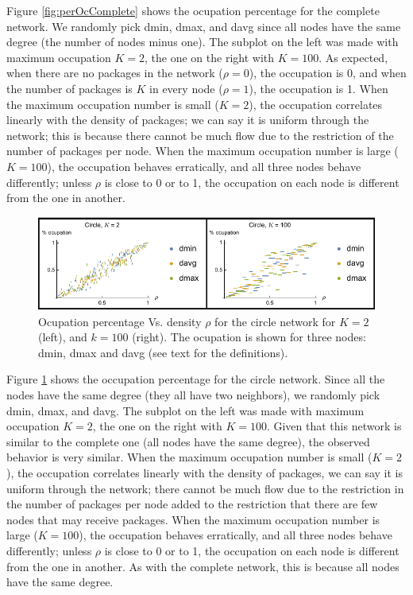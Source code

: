 \documentclass[12pt]{article}
\begin{document}
Figure \ref{fig:perOcComplete} shows the ocupation percentage for the complete network. 
We randomly pick dmin, dmax, and davg since all nodes have the same degree (the number of nodes minus one).
The subplot on the left was made with maximum occupation $K=2$, the one on the right with $K=100$.
As expected, when there are no packages in the network ($\rho =0$), the occupation is 0, and when the number of packages is $K$ in every node ($\rho=1$), the occupation is 1.
When the maximum occupation number is small ($K=2$), the occupation correlates linearly with the density of packages; we can say it is uniform through the network; this is because there cannot be much flow due to the restriction of the number of packages per node.
When the maximum occupation number is large ($K=100$), the occupation behaves erratically, and all three nodes behave differently; unless $\rho$ is close to 0 or to 1, the occupation on each node is different from the one in another.

\begin{figure}[!hbt]
  \centering
  \includegraphics[width=\textwidth]{plots/ocupationVarianceCircle.pdf}
  \caption{Ocupation percentage Vs. density $\rho$ for the circle network for $K=2$ (left), and $k=100$ (right). 
    The ocupation is shown for three nodes: dmin, dmax and davg (see text for the definitions).}
  \label{fig:perOcCircle}
\end{figure}

Figure \ref{fig:perOcCircle} shows the occupation percentage for the circle network. 
Since all the nodes have the same degree (they all have two neighbors), we randomly pick dmin, dmax, and davg.
The subplot on the left was made with maximum occupation $K=2$, the one on the right with $K=100$.
Given that this network is similar to the complete one (all nodes have the same degree), the observed behavior is very similar. 
When the maximum occupation number is small ($K=2$), the occupation correlates linearly with the density of packages, we can say it is uniform through the network; there cannot be much flow due to the restriction in the number of packages per node added to the restriction that there are few nodes that may receive packages.
When the maximum occupation number is large ($K=100$), the occupation behaves erratically, and all three nodes behave differently; unless $\rho$ is close to 0 or to 1, the occupation on each node is different from the one in another.
As with the complete network, this is because all nodes have the same degree.
\end{document}
